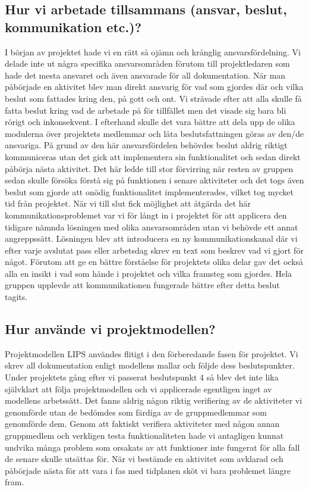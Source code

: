 \documentclass{article}
\begin{document}
\subsection{Hur vi arbetade tillsammans (ansvar, beslut, kommunikation etc.)?}
I början av projektet hade vi en rätt så ojämn och krånglig ansvarsfördelning. Vi delade inte ut några specifika ansvarsområden förutom till projektledaren som hade det mesta ansvaret och även ansvarade för all dokumentation. När man påbörjade en aktivitet blev man direkt ansvarig för vad som gjordes där och vilka beslut som fattades kring den, på gott och ont. Vi strävade efter att alla skulle få fatta beslut kring vad de arbetade på för tillfället men det visade sig bara bli rörigt och inkonsekvent. I efterhand skulle det vara bättre att dela upp de olika modulerna över projektets medlemmar och låta beslutsfattningen göras av den/de ansvariga.
\newline\newline
På grund av den här ansvarsfördelen behövdes beslut aldrig riktigt kommuniceras utan det gick att implementera sin funktionalitet och sedan direkt påbörja nästa aktivitet. Det här ledde till stor förvirring när resten av gruppen sedan skulle försöka förstå sig på funktionen i senare aktiviteter och det togs även beslut som gjorde att onödig funktionalitet implementerades, vilket tog mycket tid från projektet. När vi till slut fick möjlighet att åtgärda det här kommunikationsproblemet var vi för långt in i projektet för att applicera den tidigare nämnda lösningen med olika ansvarsområden utan vi behövde ett annat angreppssätt. Lösningen blev att introducera en ny kommunikationskanal där vi efter varje avslutat pass eller arbetsdag skrev en text som beskrev vad vi gjort för något. Förutom att ge en bättre förståelse för projektets olika delar gav det också alla en insikt i vad som hände i projektet och vilka framsteg som gjordes. Hela gruppen upplevde att kommunikationen fungerade bättre efter detta beslut tagits.

\subsection{Hur använde vi projektmodellen?}
Projektmodellen LIPS användes flitigt i den förberedande fasen för projektet. Vi skrev all dokumentation enligt modellens mallar och följde dess beslutspunkter. Under projektets gång efter vi passerat beslutspunkt 4 så blev det inte lika självklart att följa projektmodellen och vi applicerade egentligen inget av modellens arbetssätt. Det fanns aldrig någon riktig verifiering av de aktiviteter vi genomförde utan de bedömdes som färdiga av de gruppmedlemmar som genomförde dem. Genom att faktiskt verifiera aktiviteter med någon annan gruppmedlem och verkligen testa funktionaliteten hade vi antagligen kunnat undvika många problem som orsakats av att funktioner inte fungerat för alla fall de senare skulle utsättas för. När vi bestämde en aktivitet som avklarad och påbörjade nästa för att vara i fas med tidplanen sköt vi bara problemet längre fram.
\end{document}
